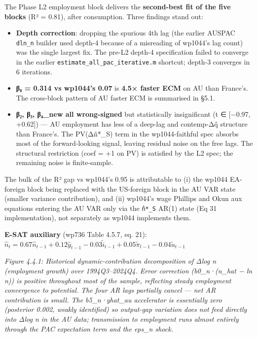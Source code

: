 \documentclass[
]{article}
\providecommand{\tightlist}{%
  \setlength{\itemsep}{0pt}\setlength{\parskip}{0pt}}
\begin{document}
The Phase L2 employment block delivers the \textbf{second-best fit of
the five blocks} (R² = 0.81), after consumption. Three findings stand
out:

\begin{itemize}
\tightlist
\item
  \textbf{Depth correction}: dropping the spurious 4th lag (the earlier
  AUSPAC \texttt{dln\_n} builder used depth-4 because of a misreading of
  wp1044's lag count) was the single largest fix. The pre-L2 depth-4
  specification failed to converge in the earlier
  \texttt{estimate\_all\_pac\_iterative.m} shortcut; depth-3 converges
  in 6 iterations.
\item
  \textbf{β₀ = 0.314 vs wp1044's 0.07} is \textbf{4.5× faster ECM} on AU
  than France's. The cross-block pattern of AU faster ECM is summarised
  in §5.1.
\item
  \textbf{β₂, β₃, β₄\_new all wrong-signed} but statistically
  insignificant (t ∈ {[}−0.97, +0.62{]}) --- AU employment has less of a
  deep-lag and contemp-Δq̂ structure than France's. The PV(Δn̂*\_S) term
  in the wp1044-faithful spec absorbs most of the forward-looking
  signal, leaving residual noise on the free lags. The structural
  restriction (coef = +1 on PV) is satisfied by the L2 spec; the
  remaining noise is finite-sample.
\end{itemize}

The bulk of the R² gap vs wp1044's 0.95 is attributable to (i) the
wp1044 EA-foreign block being replaced with the US-foreign block in the
AU VAR state (smaller variance contribution), and (ii) wp1044's wage
Phillips and Okun aux equations entering the AU VAR only via the
\texttt{n̂*\_S} AR(1) state (Eq 31 implementation), not separately as
wp1044 implements them.

\textbf{E-SAT auxiliary} (wp736 Table 4.5.7, eq. 21):
\(\hat{n}_t = 0.67 \hat{n}_{t-1} + 0.12 \hat{y}_{t-1} - 0.03 \tilde{i}_{t-1} + 0.05 \tilde{\pi}_{t-1} - 0.04 \tilde{u}_{t-1}\)

\emph{Figure 4.4.1: Historical dynamic-contribution decomposition of
Δlog n (employment growth) over 1994Q3--2024Q4. Error correction
(b0\_n·(n\_hat − ln n)) is positive throughout most of the sample,
reflecting steady employment convergence to potential. The four AR lags
partially cancel --- net AR contribution is small. The b5\_n·yhat\_au
accelerator is essentially zero (posterior 0.002, weakly identified) so
output-gap variation does not feed directly into Δlog n in the AU data;
transmission to employment runs almost entirely through the PAC
expectation term and the eps\_n shock.}
\end{document}
